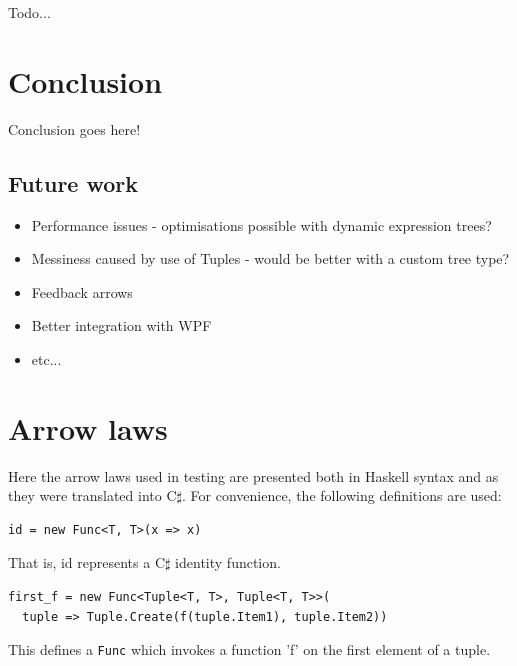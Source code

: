 \documentclass[12pt,twoside,notitlepage]{report}
\begin{document}
Todo...

\cleardoublepage



\chapter{Conclusion}

Conclusion goes here!

\section{Future work}

\begin{itemize}
	\item Performance issues - optimisations possible with dynamic expression trees?
	\item Messiness caused by use of Tuples - would be better with a custom tree type?
	\item Feedback arrows
	\item Better integration with WPF
	\item etc...
\end{itemize}

\cleardoublepage



\appendix

\chapter{Arrow laws}

Here the arrow laws used in testing are presented both in Haskell syntax and as they were translated into C$\sharp$. For convenience, the following definitions are used:

\begin{lstlisting}
id = new Func<T, T>(x => x)
\end{lstlisting}

That is, id represents a C$\sharp$ identity function.

\begin{lstlisting}
first_f = new Func<Tuple<T, T>, Tuple<T, T>>(
  tuple => Tuple.Create(f(tuple.Item1), tuple.Item2))
\end{lstlisting}

This defines a \texttt{Func} which invokes a function 'f' on the first element of a tuple.
\end{document}
